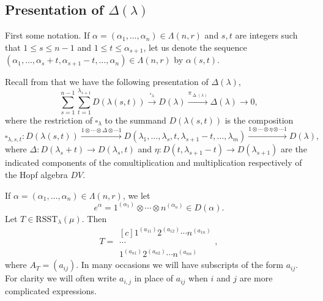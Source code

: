 \documentclass[11pt]{article}
\theoremstyle{definition}
\numberwithin{equation}{section}
\newcommand{\al}{\alpha}
\newcommand{\la}{\lambda}
\newcommand{\La}{\Lambda}
\DeclareMathOperator{\D}{\mathrm{\Delta}}
\numberwithin{equation}{section}
\begin{document}
\subsection{Presentation of \texorpdfstring{$\Delta(\la)$}{Delta(lambda)}}\label{s2.4}
First some notation. If $\al=(\al_1,\dots,\al_n) \in \La(n,r)$ and $s, t$ are integers such that $1 \le s \le n-1$ and $1 \le t \le \al_{s+1} $, let us denote the sequence $(\al_1,\dots,\al_s+t, \al_{s+1}-t,\dots,\al_n) \in \La(n,r)$ by $\al({s,t})$. 

Recall from \cite[Theorem II.3.16]{ABW} that we have the following presentation of $\Delta(\la)$, \begin{equation}\label{pres1}
\sum_{s=1}^{n-1}\sum_{t=1}^{\lambda_{s+1}}D(\la(s,t)) \xrightarrow{\square_{\la}} D(\lambda) \xrightarrow{\pi_{\D(\la)}} \Delta(\lambda) \to 0,\end{equation}
where the restriction of $ \square_{\la} $ to the summand $D(\la(s,t))$ is the composition
\begin{equation}\label{boxmap}
\square_{\la, s,t}:D(\la(s,t)) \xrightarrow{1\otimes\cdots \otimes \Delta \otimes \cdots 1}D(\lambda_1,\dots,\lambda_s,t,\lambda_{s+1}-t,\dots,\lambda_m) \xrightarrow{1\otimes\cdots \otimes \eta \otimes \cdots 1} D(\lambda),
\end{equation}
where $\Delta:D(\lambda_s+t) \to D(\lambda_s,t)$ and $\eta:D(t,\lambda_{s+1}-t) \to D(\lambda_{s+1})$ are the indicated components of the comultiplication and multiplication respectively of the Hopf algebra $DV$. 

If $\al=(\al_1,\dots,\al_n) \in \La(n,r)$, we let \[e^{\al}=1^{(\al_1)} \otimes \cdots \otimes n^{(\al_n)} \in D(\al).\] Let $T \in \mathrm{RSST}_{\la}(\mu)$. Then \[ T=\begin{matrix*}[c]
	1^{(a_{11})}2^{(a_{12})} \cdots n^{(a_{1n})} \\
	\cdots\\
	1^{(a_{n1})} 2^{(a_{n2})}\cdots n^{(a_{nn})}  \end{matrix*}, \]
where $A_T=(a_{ij})$. In many occasions we will have subscripts of the form $a_{ij}$. For clarity we will often write $a_{i,j}$ in place of $a_{ij}$ when $i$ and $j$ are more complicated expressions. 
\end{document}
